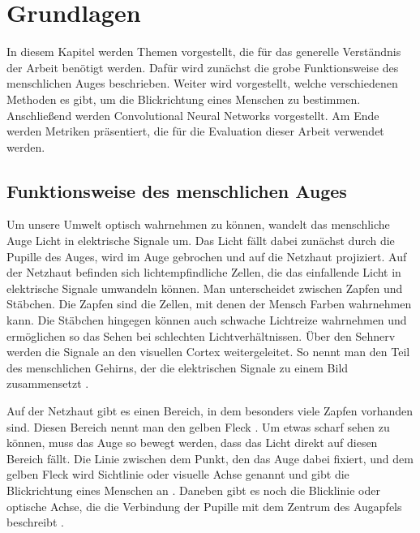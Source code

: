 \chapter{Grundlagen}\label{sec:basics}

In diesem Kapitel werden Themen vorgestellt, die für das generelle Verständnis der Arbeit benötigt werden. Dafür wird zunächst die grobe Funktionsweise des menschlichen Auges beschrieben. Weiter wird vorgestellt, welche verschiedenen Methoden es gibt, um die Blickrichtung eines Menschen zu bestimmen. Anschließend werden Convolutional Neural Networks vorgestellt. Am Ende werden Metriken präsentiert, die für die Evaluation dieser Arbeit verwendet werden.

\section{Funktionsweise des menschlichen Auges}\label{sec:basics:eye}

Um unsere Umwelt optisch wahrnehmen zu können, wandelt das menschliche Auge Licht in elektrische Signale um. Das Licht fällt dabei zunächst durch die Pupille des Auges, wird im Auge gebrochen und auf die Netzhaut \cite[S.~12]{book:eyes} projiziert. Auf der Netzhaut befinden sich lichtempfindliche Zellen, die das einfallende Licht in elektrische Signale umwandeln können. Man unterscheidet zwischen Zapfen und Stäbchen. Die Zapfen sind die Zellen, mit denen der Mensch Farben wahrnehmen kann. Die Stäbchen hingegen können auch schwache Lichtreize wahrnehmen und ermöglichen so das Sehen bei schlechten Lichtverhältnissen. Über den Sehnerv werden die Signale an den visuellen Cortex weitergeleitet. So nennt man den Teil des menschlichen Gehirns, der die elektrischen Signale zu einem Bild zusammensetzt \cite[S.~13]{book:eyes}\cite{paper:cnn}. 

Auf der Netzhaut gibt es einen Bereich, in dem besonders viele Zapfen vorhanden sind. Diesen Bereich nennt man den gelben Fleck \cite[S.~13]{book:eyes}. Um etwas scharf sehen zu können, muss das Auge so bewegt werden, dass das Licht direkt auf diesen Bereich fällt. Die Linie zwischen dem Punkt, den das Auge dabei fixiert, und dem gelben Fleck wird Sichtlinie oder visuelle Achse genannt und gibt die Blickrichtung eines Menschen an \cite{paper:basic:eye:tracking}. Daneben gibt es noch die Blicklinie oder optische Achse, die die Verbindung der Pupille mit dem Zentrum des Augapfels beschreibt \cite{paper:basic:eye:tracking}.

